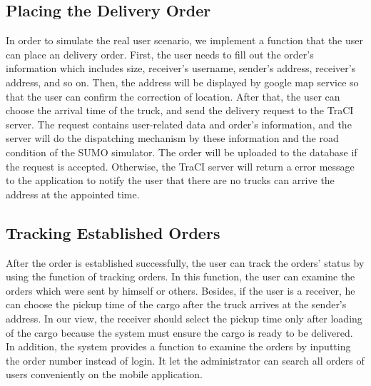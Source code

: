\documentclass[12pt]{ksthesis}
\begin{document}
\begin{thesis}
{\subsection{Placing the Delivery Order}
In order to simulate the real user scenario, we implement a function that the user can place an delivery order. First, the user needs to fill out the order’s information which includes size, receiver’s username, sender’s address, receiver’s address, and so on. Then, the address will be displayed by google map service so that the user can confirm the correction of location. After that, the user can choose the arrival time of the truck, and send the delivery request to the TraCI server. The request contains user-related data and order’s information, and the server will do the dispatching mechanism by these information and the road condition of the SUMO simulator. The order will be uploaded to the database if the request is accepted. Otherwise, the TraCI server will return a error message to the application to notify the user that there are no trucks can arrive the address at the appointed time.

\subsection{Tracking Established Orders}
After the order is established successfully, the user can track the orders’ status by using the function of tracking orders. In this function, the user can examine the orders which were sent by himself or others. Besides, if the user is a receiver, he can choose the pickup time of the cargo after the truck arrives at the sender’s address. In our view, the receiver should select the pickup time only after loading of the cargo because the system must ensure the cargo is ready to be delivered. In addition, the system provides a function to examine the orders by inputting the order number instead of login. It let the administrator can search all orders of users conveniently on the mobile application.

}
\end{thesis}
\end{document}

